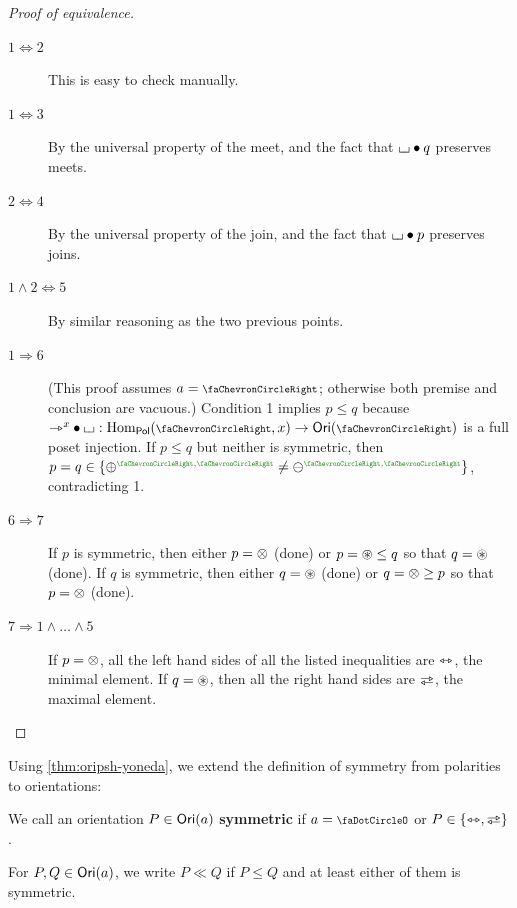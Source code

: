 \documentclass[a4paper]{memoir}
\begin{document}
\begin{proof}[Proof of equivalence]
	\begin{description}
		\item[$1 \Leftrightarrow 2$] This is easy to check manually.
		\item[$1 \Leftrightarrow 3$] By the universal property of the meet, and the fact that ${\llcorner\hspace{-.4ex}\lrcorner} \mathbin{\bullet} q$ preserves meets.
		\item[$2 \Leftrightarrow 4$] By the universal property of the join, and the fact that ${\llcorner\hspace{-.4ex}\lrcorner} \mathbin{\bullet} p$ preserves joins.
		\item[$1 \wedge 2 \Leftrightarrow 5$] By similar reasoning as the two previous points.
		\item[$1 \Rightarrow 6$] (This proof assumes $a = \ypolar$; otherwise both premise and conclusion are vacuous.) Condition 1 implies $p \leq q$ because $\jetsym^x \oriof \loch : \Hom_\polcat(\ypolar, x) \to \oripsh(\ypolar)$ is a full poset injection. If $p \leq q$ but neither is symmetric, then $p = q \in \accol{\pospol \pmryy \neq \negpol \pmryy}$, contradicting 1.
		\item[$6 \Rightarrow 7$] If $p$ is symmetric, then either $p = {\otimes}$ (done) or $p = {\oast} \leq q$ so that $q = {\oast}$ (done). If $q$ is symmetric, then either $q = {\oast}$ (done) or $q = {\otimes} \geq p$ so that $p = {\otimes}$ (done).
		\item[$7 \Rightarrow 1 \wedge \ldots \wedge 5$] If $p = {\otimes}$, all the left hand sides of all the listed inequalities are $\leftrightarrowtriangle$, the minimal element. If $q = {\oast}$, then all the right hand sides are $\infrajet$, the maximal element. \qedhere
	\end{description}
\end{proof}

Using \cref{thm:oripsh-yoneda}, we extend the definition of symmetry from polarities to orientations:
\begin{definition}
	We call an orientation $P \in {\mathsf{Ori}}(a)$ \textbf{symmetric} if $a = \npolar$ or $P \in \accol{\equijetsym, \infrajetsym}$.
	
	For $P, Q \in {\mathsf{Ori}}(a)$, we write $P \ll Q$ if $P \leq Q$ and at least either of them is symmetric.
\end{definition}
\end{document}

